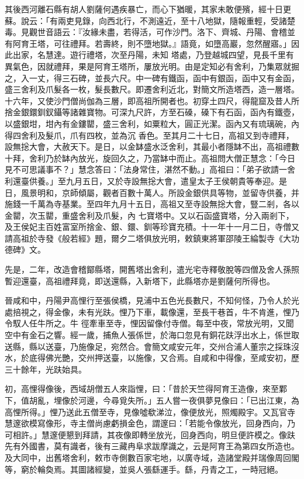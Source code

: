 \begin{pinyinscope}
 其後西河離石縣有胡人劉薩何遇疾暴亡，而心下猶暖，其家未敢便殯，經十日更蘇。說云：「有兩吏見錄，向西北行，不測遠近，至十八地獄，隨報重輕，受諸楚毒。見觀世音語云：『汝緣未盡，若得活，可作沙門。洛下、齊城、丹陽、會稽並有阿育王塔，可往禮拜。若壽終，則不墮地獄。』語竟，如墮高巖，忽然醒寤。」因此出家，名慧達。遊行禮塔，次至丹陽，未知
 塔處，乃登越城四望，見長千里有異氣色，因就禮拜，果是阿育王塔所，屢放光明。由是定知必有舍利，乃集眾就掘之，入一丈，得三石碑，並長六尺。中一碑有鐵函，函中有銀函，函中又有金函，盛三舍利及爪髮各一枚，髮長數尺。即遷舍利近北，對簡文所造塔西，造一層塔。十六年，又使沙門僧尚伽為三層，即高祖所開者也。初穿土四尺，得龍窟及昔人所捨金銀鐶釧釵鑷等諸雜寶物。可深九尺許，方至石磉，磉下有石函，函內有鐵壺，以盛銀坩，坩內有金鏤罌，盛三舍利，如粟粒大，圓正光潔。函內又有琉璃碗，內得四舍利及髮爪，爪有四枚，並為沉
 香色。至其月二十七日，高祖又到寺禮拜，設無捴大會，大赦天下。是日，以金缽盛水泛舍利，其最小者隱缽不出，高祖禮數十拜，舍利乃於缽內放光，旋回久之，乃當缽中而止。高祖問大僧正慧念：「今日見不可思議事不？」慧念答曰：「法身常住，湛然不動。」高祖曰：「弟子欲請一舍利還臺供養。」至九月五日，又於寺設無捴大會，遣皇太子王侯朝貴等奉迎。是日，風景明和，京師傾屬，觀者百數十萬人。所設金銀供具等物，並留寺供養，并施錢一千萬為寺基業。至四年九月十五日，高祖又至寺設無捴大會，豎二剎，各以金罌，次玉罌，重盛舍利及爪髮，內
 七寶塔中。又以石函盛寶塔，分入兩剎下，及王侯妃主百姓富室所捨金、銀、鐶、釧等珍寶充積。十一年十一月二日，寺僧又請高祖於寺發《般若經》題，爾夕二塔俱放光明，敕鎮東將軍邵陵王綸製寺《大功德碑》文。



 先是，二年，改造會稽鄮縣塔，開舊塔出舍利，遣光宅寺釋敬脫等四僧及舍人孫照暫迎還臺，高祖禮拜竟，即送還縣，入新塔下，此縣塔亦是劉薩何所得也。



 晉咸和中，丹陽尹高悝行至張侯橋，見浦中五色光長數尺，不知何怪，乃令人於光處掊視之，得金像，未有光趺。悝乃下車，載像還，至長干巷首，牛不肯進，悝乃令馭人任牛所之。牛
 徑牽車至寺，悝因留像付寺僧。每至中夜，常放光明，又聞空中有金石之響。經一歲，捕魚人張係世，於海口忽見有銅花趺浮出水上，係世取送縣，縣以送臺，乃施像足，宛然合。會簡文咸安元年，交州合浦人董宗之採珠沒水，於底得佛光艷，交州押送臺，以施像，又合焉。自咸和中得像，至咸安初，歷三十餘年，光趺始具。



 初，高悝得像後，西域胡僧五人來詣悝，曰：「昔於天竺得阿育王造像，來至鄴下，值胡亂，埋像於河邊，今尋覓失所。」五人嘗一夜俱夢見像曰：「已出江東，為高悝所得。」悝乃送此五僧至寺，見像噓欷涕泣，像便放光，照燭殿宇。又瓦官寺
 慧邃欲模寫像形，寺主僧尚慮虧損金色，謂邃曰：「若能令像放光，回身西向，乃可相許。」慧邃便懇到拜請，其夜像即轉坐放光，回身西向，明旦便許模之。像趺先有外國書，莫有識者，後有三藏冉阜求跋摩識之，云是阿育王為第四女所造也。及大同中，出舊塔舍利，敕市寺側數百家宅地，以廣寺域，造諸堂殿并瑞像周回閣等，窮於輪奐焉。其圖諸經變，並吳人張繇運手。繇，丹青之工，一時冠絕。




\end{pinyinscope}
